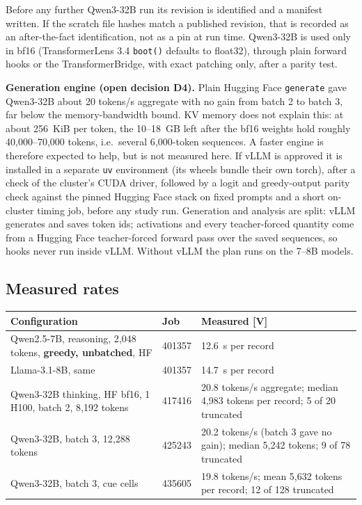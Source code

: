 \documentclass[10pt,a4paper]{article}
\newcommand{\tg}[1]{\textsc{[#1]}}
\begin{document}
Before any further Qwen3-32B run its revision is identified and a manifest written. If the scratch file hashes
match a published revision, that is recorded as an after-the-fact identification, not as a pin at run time.
Qwen3-32B is used only in bf16 (TransformerLens 3.4 \texttt{boot()} defaults to float32), through plain forward
hooks or the TransformerBridge, with exact patching only, after a parity test.

\textbf{Generation engine (open decision D4).} Plain Hugging Face \texttt{generate} gave Qwen3-32B about 20 tokens/s
aggregate with no gain from batch 2 to batch 3, far below the memory-bandwidth bound. KV memory does not explain
this: at about 256~KiB per token, the 10--18~GB left after the bf16 weights hold roughly 40{,}000--70{,}000
tokens, i.e.\ several 6{,}000-token sequences. A faster engine is therefore expected to help, but is not measured
here. If vLLM is approved it is installed in a separate \texttt{uv} environment (its wheels bundle their own
torch), after a check of the cluster's CUDA driver, followed by a logit and greedy-output parity check against the
pinned Hugging Face stack on fixed prompts and a short on-cluster timing job, before any study run. Generation and
analysis are split: vLLM generates and saves token ids; activations and every teacher-forced quantity come from a
Hugging Face teacher-forced forward pass over the saved sequences, so hooks never run inside vLLM. Without vLLM
the plan runs on the 7--8B models.

\subsection{Measured rates}
\label{sec:compute-rates}

\begin{center}\small
\begin{tabularx}{\linewidth}{@{}P{4.2cm}P{2.2cm}L@{}}
\toprule
Configuration & Job & Measured \tg{V} \\
\midrule
Qwen2.5-7B, reasoning, 2{,}048 tokens, \textbf{greedy, unbatched}, HF & 401357 & 12.6~s per record \\
Llama-3.1-8B, same & 401357 & 14.7~s per record \\
Qwen3-32B thinking, HF bf16, 1 H100, batch 2, 8{,}192 tokens & 417416 & 20.8 tokens/s aggregate; median 4{,}983
tokens per record; 5 of 20 truncated \\
Qwen3-32B, batch 3, 12{,}288 tokens & 425243 & 20.2 tokens/s (batch 3 gave no gain); median 5{,}242 tokens; 9 of
78 truncated \\
Qwen3-32B, batch 3, cue cells & 435605 & 19.8 tokens/s; mean 5{,}632 tokens per record; 12 of 128 truncated \\
\bottomrule
\end{tabularx}
\end{center}
\end{document}
